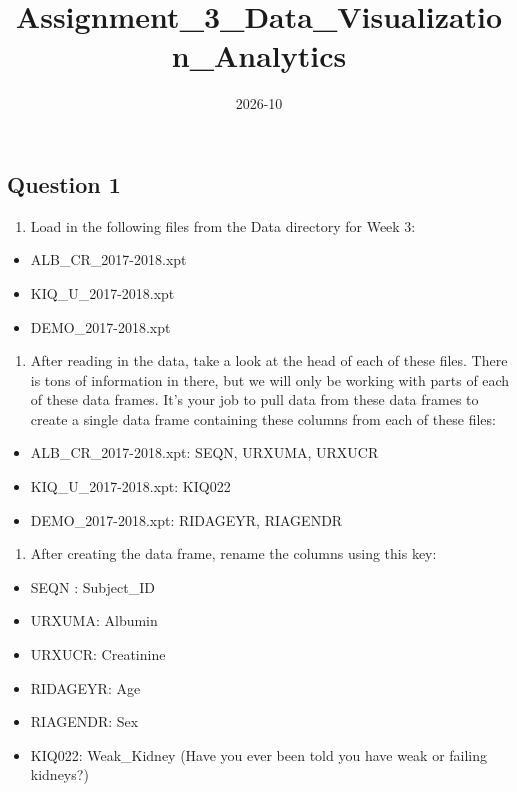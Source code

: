 \documentclass[
]{article}
\title{Assignment\_3\_Data\_Visualization\_Analytics}
\author{}
\date{\vspace{-2.5em}2026-10}
\providecommand{\tightlist}{%
  \setlength{\itemsep}{0pt}\setlength{\parskip}{0pt}}
\begin{document}
\maketitle

\subsection{Question 1}\label{question-1}

\begin{enumerate}
\def\labelenumi{\arabic{enumi})}
\tightlist
\item
  Load in the following files from the Data directory for Week 3:
\end{enumerate}

\begin{itemize}
\tightlist
\item
  ALB\_CR\_2017-2018.xpt
\item
  KIQ\_U\_2017-2018.xpt
\item
  DEMO\_2017-2018.xpt
\end{itemize}

\begin{enumerate}
\def\labelenumi{\alph{enumi})}
\tightlist
\item
  After reading in the data, take a look at the head of each of these
  files. There is tons of information in there, but we will only be
  working with parts of each of these data frames. It's your job to pull
  data from these data frames to create a single data frame containing
  these columns from each of these files:
\end{enumerate}

\begin{itemize}
\tightlist
\item
  ALB\_CR\_2017-2018.xpt: SEQN, URXUMA, URXUCR
\item
  KIQ\_U\_2017-2018.xpt: KIQ022
\item
  DEMO\_2017-2018.xpt: RIDAGEYR, RIAGENDR
\end{itemize}

\begin{enumerate}
\def\labelenumi{\alph{enumi})}
\setcounter{enumi}{1}
\tightlist
\item
  After creating the data frame, rename the columns using this key:
\end{enumerate}

\begin{itemize}
\tightlist
\item
  SEQN : Subject\_ID
\item
  URXUMA: Albumin
\item
  URXUCR: Creatinine
\item
  RIDAGEYR: Age
\item
  RIAGENDR: Sex
\item
  KIQ022: Weak\_Kidney (Have you ever been told you have weak or failing
  kidneys?)
\end{itemize}
\end{document}
